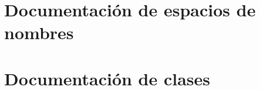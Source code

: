 \documentclass[twoside]{book}
\newcommand{\+}{\discretionary{\mbox{\scriptsize$\hookleftarrow$}}{}{}}
\begin{document}
\chapter{Documentación de espacios de nombres}






\chapter{Documentación de clases}













\end{document}
